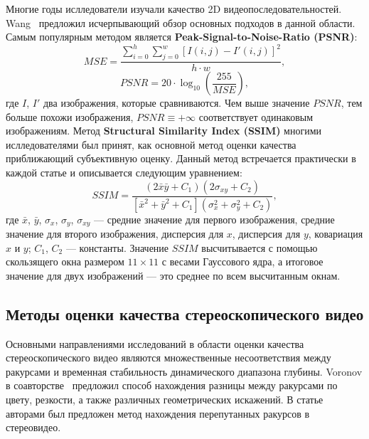\documentclass[14pt, a4paper]{extarticle}
\begin{document}
Многие годы ислледователи изучали качество 2D видеопоследовательностей. 
Wang~\cite{wang2006survey} предложил исчерпывающий обзор основных подходов в данной области.
Самым популярным методом является \textbf{Peak-Signal-to-Noise-Ratio (PSNR)}:
\begin{equation*}
	MSE = \frac{\sum_{i=0}^{h}\sum_{j=0}^{w}[I(i, j) - I'(i, j)]^2}{h \cdot w},
\end{equation*}
\begin{equation}
	PSNR = 20 \cdot \log_{10}(\frac{255}{MSE}),
\end{equation}
где $I$, $I'$ два изображения, которые сравниваются. Чем выше значение $PSNR$, 
тем больше похожи изображения, $PSNR \equiv +\infty$ соответствует одинаковым изображениям. 
Метод \textbf{Structural Similarity Index (SSIM)} многими ислледователями был принят, 
как основной метод оценки качества приближающий субъективную оценку. Данный метод встречается
практически в каждой статье и описывается следующим уравнением:
\begin{equation}
	SSIM = \frac{(2\bar{x}\bar{y} + C_1)(2\sigma_{xy} + C_	2)}{[\bar{x}^2 + \bar{y}^2 + C_1](\sigma_x^2 + \sigma_y^2 + C_2)},
\end{equation} 
где $\bar{x}$, $\bar{y}$, $\sigma_x$, $\sigma_y$, $\sigma_{xy}$ --- средние значение 
для первого изображения, средние значение для второго изображения, дисперсия для $x$, 
дисперсия для $y$, ковариация $x$ и $y$; $C_1$, $C_2$ --- константы. Значение $SSIM$ 
высчитывается с помощью скользящего окна размером $11 \times 11$ с весами Гауссового ядра, 
а итоговое значение для двух изображений --- это среднее по всем высчитанным окнам.

\subsection{Методы оценки качества стереоскопического видео}

Основными направлениями исследований в области оценки качества стереоскопического видео 
являются множественные несоответствия между ракурсами и временная стабильность 
динамического диапазона глубины. Voronov в соавторстве~\cite{voronov2012towards} предложил
способ нахождения разницы между ракурсами по цвету, резкости, 
а также различных геометрических искажений. В статье~\cite{akimov2012automatic} авторами 
был предложен метод нахождения перепутанных ракурсов в стереовидео. 
\end{document}
